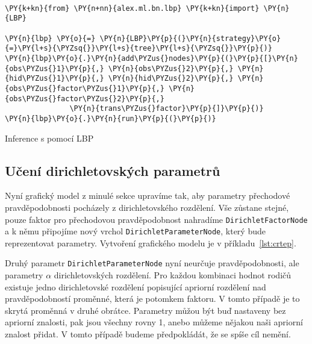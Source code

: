 \begin{example}
\begin{Verbatim}[commandchars=\\\{\}]

\PY{k+kn}{from} \PY{n+nn}{alex.ml.bn.lbp} \PY{k+kn}{import} \PY{n}{LBP}

\PY{n}{lbp} \PY{o}{=} \PY{n}{LBP}\PY{p}{(}\PY{n}{strategy}\PY{o}{=}\PY{l+s}{\PYZsq{}}\PY{l+s}{tree}\PY{l+s}{\PYZsq{}}\PY{p}{)}
\PY{n}{lbp}\PY{o}{.}\PY{n}{add\PYZus{}nodes}\PY{p}{(}\PY{p}{[}\PY{n}{obs\PYZus{}1}\PY{p}{,} \PY{n}{obs\PYZus{}2}\PY{p}{,} \PY{n}{hid\PYZus{}1}\PY{p}{,} \PY{n}{hid\PYZus{}2}\PY{p}{,} \PY{n}{obs\PYZus{}factor\PYZus{}1}\PY{p}{,} \PY{n}{obs\PYZus{}factor\PYZus{}2}\PY{p}{,}
               \PY{n}{trans\PYZus{}factor}\PY{p}{]}\PY{p}{)}
\PY{n}{lbp}\PY{o}{.}\PY{n}{run}\PY{p}{(}\PY{p}{)}
\end{Verbatim}
\caption{Inference s pomocí LBP}
\label{lst:lbpex}
\end{example}

%

\subsection{Učení dirichletovských parametrů}

Nyní grafický model z minulé sekce upravíme tak, aby parametry přechodové pravděpodobnosti pocházely z dirichletovského rozdělení.
Vše zůstane stejné, pouze faktor pro přechodovou pravděpodobnost nahradíme \texttt{DirichletFactorNode} a k němu připojíme nový vrchol \texttt{DirichletParameterNode}, který bude reprezentovat parametry.
Vytvoření grafického modelu je v příkladu~\ref{lst:crtep}.

Druhý parametr \texttt{DirichletParameterNode} nyní neurčuje pravděpodobnosti, ale parametry $\alpha$ dirichletovských rozdělení.
Pro každou kombinaci hodnot rodičů existuje jedno dirichletovské rozdělení popisující apriorní rozdělení nad pravděpodobností proměnné, která je potomkem faktoru.
V tomto případě je to skrytá proměnná v druhé obrátce.
Parametry můžou být buď nastaveny bez apriorní znalosti, pak jsou všechny rovny 1, anebo můžeme nějakou naši apriorní znalost přidat.
V tomto případě budeme předpokládát, že se spíše cíl nemění.


